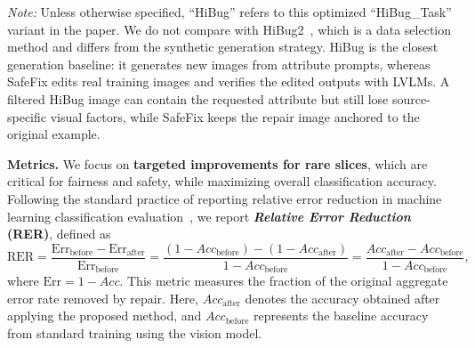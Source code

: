 \documentclass[10pt]{article} %
\newcommand{\model}{SafeFix\xspace}
\newcommand{\hibug}{HiBug\xspace}
\begin{document}
\begin{itemize}
    \textit{Note:} Unless otherwise specified, ``\hibug'' refers to this optimized ``HiBug\_Task'' variant in the paper. We do not compare with HiBug2~\citep{chen2025hibug2}, which is a data selection method and differs from the synthetic generation strategy. \hibug{} is the closest generation baseline: it generates new images from attribute prompts, whereas \model edits real training images and verifies the edited outputs with LVLMs. A filtered \hibug{} image can contain the requested attribute but still lose source-specific visual factors, while \model keeps the repair image anchored to the original example.

\end{itemize}



\noindent\textbf{Metrics.} We focus on \textbf{targeted improvements for rare slices}, which are critical for fairness and safety, while maximizing overall classification accuracy. Following the standard practice of reporting relative error reduction in machine learning classification evaluation~\citep{manning1999foundations}, we report \textbf{\emph{Relative Error Reduction} (RER)}, defined as
\vspace{-4pt}
\begin{equation}
\mathrm{RER}
= \dfrac{\mathrm{Err}_{\text{before}} - \mathrm{Err}_{\text{after}}}
{\mathrm{Err}_{\text{before}}}
= \dfrac{(1 - Acc_{\text{before}}) - (1 - Acc_{\text{after}})}{1 - Acc_{\text{before}}}
= \dfrac{Acc_{\text{after}} - Acc_{\text{before}}}{1 - Acc_{\text{before}}},
\end{equation}
where $\mathrm{Err}=1-Acc$. This metric measures the fraction of the original aggregate error rate removed by repair. Here, $Acc_{\text{after}}$ denotes the accuracy obtained after applying the proposed method, and $Acc_{\text{before}}$ represents the baseline accuracy from standard training using the vision model.
\end{document}
